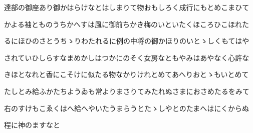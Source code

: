\documentclass[a4paper,11pt,landscape]{ltjtarticle}
\begin{document}
達部の御座あり御かはらけなとはしまりて物おもしろく成行にもとめこまひて
\par\medskip
かよる袖とものうちかへすは風に御前ちかき梅のいといたくほころひこほれた
\par\medskip
るにほひのさとうちゝりわたれるに例の中将の御かほりのいとゝしくもてはや
\par\medskip
されていひしらすなまめかしはつかにのそく女房なともやみはあやなく心許な
\par\medskip
きほとなれと香にこそけに似たる物なかりけれとめてあへりおとゝもいとめて
\par\medskip
たしとみ給ふかたちようゐも常よりまさりてみたれぬさまにおさめたるをみて
\par\medskip
右のすけもこゑくはへ給へやいたうまらうとたゝしやとのたまへはにくからぬ
\par\medskip
程に神のますなと
\par\medskip
\end{document}
